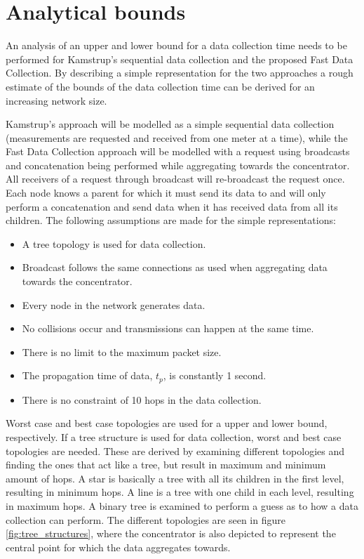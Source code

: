 \chapter{Analytical bounds}
\label{sec:analytical_bounds}

An analysis of an upper and lower bound for a data collection time needs to be performed for Kamstrup's sequential data collection and the proposed Fast Data Collection. By describing a simple representation for the two approaches a rough estimate of the bounds of the data collection time can be derived for an increasing network size.

Kamstrup's approach will be modelled as a simple sequential data collection (measurements are requested and received from one meter at a time), while the Fast Data Collection approach will be modelled with a request using broadcasts and concatenation being performed while aggregating towards the concentrator. All receivers of a request through broadcast will re-broadcast the request once. Each node knows a parent for which it must send its data to and will only perform a concatenation and send data when it has received data from all its children. The following assumptions are made for the simple representations:

\begin{itemize}
\item A tree topology is used for data collection.
\item Broadcast follows the same connections as used when aggregating data towards the concentrator.
\item Every node in the network generates data.
\item No collisions occur and transmissions can happen at the same time.
\item There is no limit to the maximum packet size.
\item The propagation time of data, $t_p$, is constantly 1 second.
\item There is no constraint of 10 hops in the data collection.
\end{itemize}

Worst case and best case topologies are used for a upper and lower bound, respectively. If a tree structure is used for data collection, worst and best case topologies are needed. These are derived by examining different topologies and finding the ones that act like a tree, but result in maximum and minimum amount of hops. A star is basically a tree with all its children in the first level, resulting in minimum hops. A line is a tree with one child in each level, resulting in maximum hops. A binary tree is examined to perform a guess as to how a data collection can perform. The different topologies are seen in figure \ref{fig:tree_structures}, where the concentrator is also depicted to represent the central point for which the data aggregates towards.

